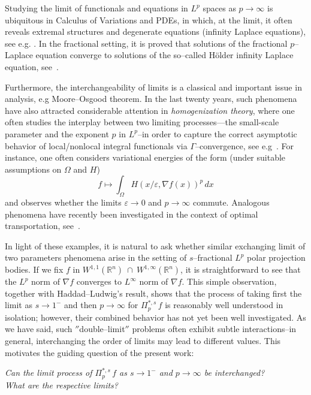 \documentclass[11pt, reqno]{article}
\theoremstyle{definition}
\numberwithin{equation}{section}
\newcommand{\R}{\mathbb{R}}
\begin{document}
\medskip

Studying the limit of functionals and equations in $L^p$ spaces as $p \to \infty$ is ubiquitous in Calculus of Variations and PDEs, in which, at the limit, it often reveals extremal structures and degenerate equations (infinity Laplace equations), see e.g. \cite{ACJ_2004, Yu_2006}.
In the fractional setting, it is proved that solutions of the fractional $p$--Laplace equation converge to solutions of the so--called H\"older infinity Laplace equation, see~\cite{CLM_2012}.

\medskip

Furthermore, the interchangeability of limits is a classical and important issue in analysis, e.g Moore--Osgood theorem.
In the last twenty years, such phenomena have also attracted considerable attention in \emph{homogenization theory}, where one often studies the interplay between two limiting processes---the small-scale parameter and the exponent $p$ in $L^p$--in order to capture the correct asymptotic behavior of local/nonlocal integral functionals via $\Gamma$--convergence, see e.g~\cite{BN_2008,  BPG_2004, CP_2005, DEZ_2024, KZ_2020}.
For instance, one often considers variational energies of the form (under suitable assumptions on $\Omega$ and $H$)
\[
f \mapsto \int_\Omega H(x/\varepsilon, \nabla f(x))^p\,dx
\]
and observes whether the limits $\varepsilon\to0$ and $p\to\infty$ commute.
Analogous phenomena have recently been investigated in the context of optimal transportation, see~\cite{BCP_2024}.

\medskip

In light of these examples, it is natural to ask whether similar exchanging limit of two parameters phenomena arise in the setting of $s$--fractional $L^p$ polar projection bodies.
If we fix $f$ in $W^{1, 1}(\R^n)~ \cap~ W^{1, \infty}(\R^n)$, it is straightforward to see that the $L^p$ norm of $\nabla f$ converges to $L^\infty$ norm of $\nabla f$.
This simple observation, together with Haddad--Ludwig's result, shows that the process of taking first the limit as $s \to 1^-$ and then $p \to \infty$ for $\Pi^{\ast, s}_p \, f$ is reasonably well understood in isolation; however, their combined behavior has not yet been well investigated.
As we have said, such $''$double--limit$''$ problems often exhibit subtle interactions--in general, interchanging the order of limits may lead to different values.
This motivates the guiding question of the present work:
\begin{center}
\textit{
   Can the limit process of \( \Pi^{\ast, s}_p \, f \) as \( s \to 1^- \) and \( p \to \infty \) be interchanged? \\ \smallskip 
   What are the respective limits?
}
\end{center}
\end{document}
